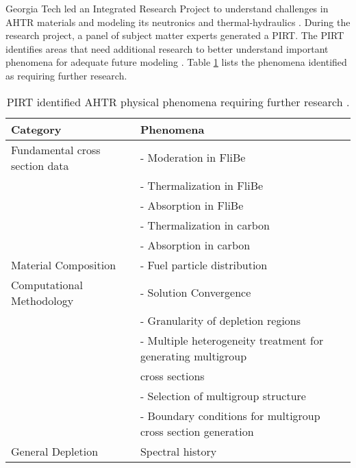 \gls{Georgia Tech} led an Integrated Research Project to 
understand challenges in \gls{AHTR} materials and modeling its neutronics and 
thermal-hydraulics \cite{zhang_integrated_2019}. 
During the research project, a panel of subject matter experts 
generated a \gls{PIRT}.
The \gls{PIRT} identifies areas that need additional research to better 
understand important phenomena for adequate future modeling
\cite{rahnema_phenomena_2019}. 
Table \ref{tab:phenomena} lists the phenomena identified as requiring further 
research. 

\begin{table}[]
    \centering
    \onehalfspacing
    \caption{\acrlong{PIRT} identified \acrlong{AHTR} physical phenomena requiring 
    further research \cite{rahnema_phenomena_2019}.}
	\label{tab:phenomena}
    \small
    \begin{tabular}{l|l}
    \hline
    \textbf{Category} & \textbf{Phenomena} \\ \hline
    Fundamental cross section data & - Moderation in FliBe \\
    & - Thermalization in FliBe \\
    & - Absorption in FliBe \\
    & - Thermalization in carbon \\
    & - Absorption in carbon \\ \hline
    Material Composition & - Fuel particle distribution \\ \hline
    Computational Methodology & - Solution Convergence \\ 
    & - Granularity of depletion regions \\
    & - Multiple heterogeneity treatment for generating multigroup \\ 
    & cross sections \\
    & - Selection of multigroup structure \\
    & - Boundary conditions for multigroup cross section generation \\ \hline 
    General Depletion & Spectral history \\ \hline 
    \end{tabular}
    \end{table}

